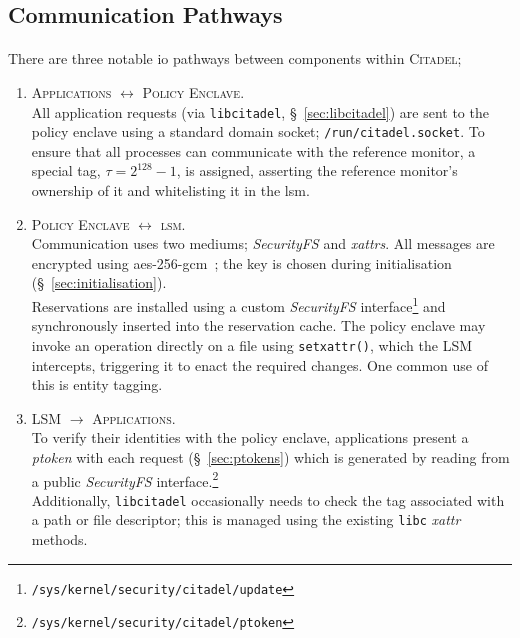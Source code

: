 \subsection{Communication Pathways}
\label{sec:interdomain-comms}
\paragraph{} There are three notable \acrshort{io} pathways between components within \textsc{Citadel};
\begin{enumerate}
    \item \textsc{Applications $\longleftrightarrow$ Policy Enclave}. \\
    All application requests (via \texttt{libcitadel}, §~\ref{sec:libcitadel}) are sent to the policy enclave using a standard domain socket; \texttt{/run/citadel.socket}. To ensure that all processes can communicate with the reference monitor, a special tag, $\tau = 2^{128} -1$, is assigned, asserting the reference monitor's ownership of it and whitelisting it in the \acrshort{lsm}.
    \vspace{5mm} %
    \item \textsc{Policy Enclave $\longleftrightarrow$ \acrshort{lsm}}. \\
    Communication uses two mediums; \textit{SecurityFS} and \textit{\acrshort{xattr}s}. All messages are encrypted using \acrshort{aes}-256-\acrshort{gcm}~\cite{Rijndael,McGrew2005TheGM}; the key is chosen during initialisation (§~\ref{sec:initialisation}). \\
    Reservations are installed using a custom \textit{SecurityFS} interface\footnote{\texttt{/sys/kernel/security/citadel/update}} and synchronously inserted into the reservation cache. The policy enclave may invoke an operation directly on a file using \texttt{setxattr()}, which the LSM intercepts, triggering it to enact the required changes. One common use of this is entity tagging.
    \item \textsc{LSM $\longrightarrow$ Applications}. \\
    To verify their identities with the policy enclave, applications present a \textit{ptoken} with each request (§~\ref{sec:ptokens}) which is generated by reading from a public \textit{SecurityFS} interface.\footnote{\texttt{/sys/kernel/security/citadel/ptoken}} \\
    Additionally, \texttt{libcitadel} occasionally needs to check the tag associated with a path or file descriptor; this is managed using the existing \texttt{libc} \textit{\acrshort{xattr}} methods.
\end{enumerate}

